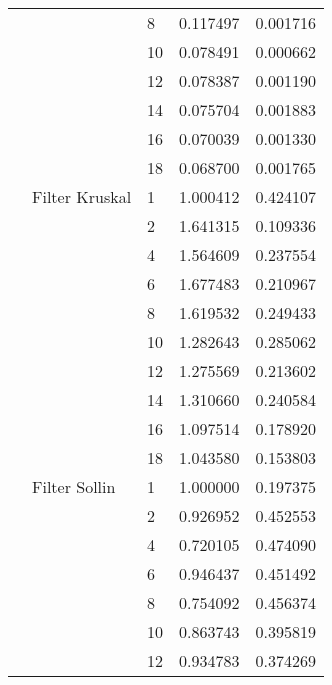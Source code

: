 \begin{tabular}{lllrr}
                      &                     & 8  &  0.117497 &  0.001716 \\
                      &                     & 10 &  0.078491 &  0.000662 \\
                      &                     & 12 &  0.078387 &  0.001190 \\
                      &                     & 14 &  0.075704 &  0.001883 \\
                      &                     & 16 &  0.070039 &  0.001330 \\
                      &                     & 18 &  0.068700 &  0.001765 \\
                      & Filter Kruskal & 1  &  1.000412 &  0.424107 \\
                      &                     & 2  &  1.641315 &  0.109336 \\
                      &                     & 4  &  1.564609 &  0.237554 \\
                      &                     & 6  &  1.677483 &  0.210967 \\
                      &                     & 8  &  1.619532 &  0.249433 \\
                      &                     & 10 &  1.282643 &  0.285062 \\
                      &                     & 12 &  1.275569 &  0.213602 \\
                      &                     & 14 &  1.310660 &  0.240584 \\
                      &                     & 16 &  1.097514 &  0.178920 \\
                      &                     & 18 &  1.043580 &  0.153803 \\
                      & Filter Sollin & 1  &  1.000000 &  0.197375 \\
                      &                     & 2  &  0.926952 &  0.452553 \\
                      &                     & 4  &  0.720105 &  0.474090 \\
                      &                     & 6  &  0.946437 &  0.451492 \\
                      &                     & 8  &  0.754092 &  0.456374 \\
                      &                     & 10 &  0.863743 &  0.395819 \\
                      &                     & 12 &  0.934783 &  0.374269 \\

\end{tabular}

